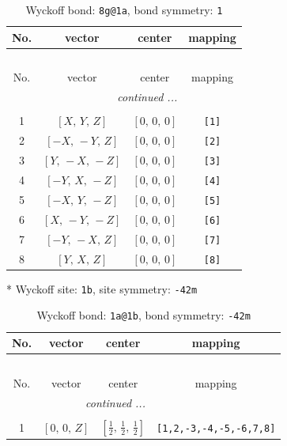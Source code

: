 \documentclass[fleqn,8pt]{jsarticle}
\begin{document}
\renewcommand{\arraystretch}{1.2}
\begin{longtable}{cccc}
\caption{Wyckoff bond: {\tt 8g@1a}, bond symmetry: {\tt 1}}
 \\
 \hline \hline
No. & vector & center & mapping \\ \hline \endfirsthead

\multicolumn{3}{l}{\tablename\ \thetable{}} \\
 \hline \hline
No. & vector & center & mapping \\ \hline \endhead

 \hline \hline
\multicolumn{3}{r}{\footnotesize\it continued ...} \\ \endfoot

 \hline \hline
\multicolumn{3}{r}{} \\ \endlastfoot

1 & $\left[ X,\, Y,\, Z \right]$ & $\left[ 0,\, 0,\, 0 \right]$ & {\tt [1]} \\ \hline
2 & $\left[ - X,\, - Y,\, Z \right]$ & $\left[ 0,\, 0,\, 0 \right]$ & {\tt [2]} \\ \hline
3 & $\left[ Y,\, - X,\, - Z \right]$ & $\left[ 0,\, 0,\, 0 \right]$ & {\tt [3]} \\ \hline
4 & $\left[ - Y,\, X,\, - Z \right]$ & $\left[ 0,\, 0,\, 0 \right]$ & {\tt [4]} \\ \hline
5 & $\left[ - X,\, Y,\, - Z \right]$ & $\left[ 0,\, 0,\, 0 \right]$ & {\tt [5]} \\ \hline
6 & $\left[ X,\, - Y,\, - Z \right]$ & $\left[ 0,\, 0,\, 0 \right]$ & {\tt [6]} \\ \hline
7 & $\left[ - Y,\, - X,\, Z \right]$ & $\left[ 0,\, 0,\, 0 \right]$ & {\tt [7]} \\ \hline
8 & $\left[ Y,\, X,\, Z \right]$ & $\left[ 0,\, 0,\, 0 \right]$ & {\tt [8]} \\
\end{longtable}
* Wyckoff site: {\tt 1b}, site symmetry: {\tt -42m}
\renewcommand{\arraystretch}{1.2}
\begin{longtable}{cccc}
\caption{Wyckoff bond: {\tt 1a@1b}, bond symmetry: {\tt -42m}}
 \\
 \hline \hline
No. & vector & center & mapping \\ \hline \endfirsthead

\multicolumn{3}{l}{\tablename\ \thetable{}} \\
 \hline \hline
No. & vector & center & mapping \\ \hline \endhead

 \hline \hline
\multicolumn{3}{r}{\footnotesize\it continued ...} \\ \endfoot

 \hline \hline
\multicolumn{3}{r}{} \\ \endlastfoot

1 & $\left[ 0,\, 0,\, Z \right]$ & $\left[ \frac{1}{2},\, \frac{1}{2},\, \frac{1}{2} \right]$ & {\tt [1,2,-3,-4,-5,-6,7,8]} \\
\end{longtable}
\end{document}
